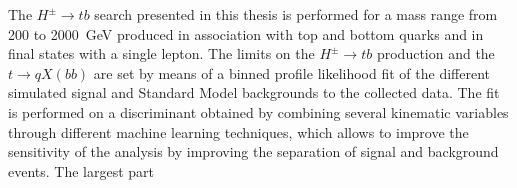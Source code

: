 The $H^\pm\to tb$ search presented in this thesis is performed for a mass range from 200 to 2000~GeV produced in association with top and bottom quarks and in final states with a single lepton. The limits on the $H^\pm\to tb$ production and the $t\to qX(bb)$ are set by means of a binned profile likelihood fit of the different simulated signal and Standard Model backgrounds to the collected data. The fit is performed on a discriminant obtained by combining several kinematic variables through different machine learning techniques, which allows to improve the sensitivity of the analysis by improving the separation of signal and background events. The largest part 
